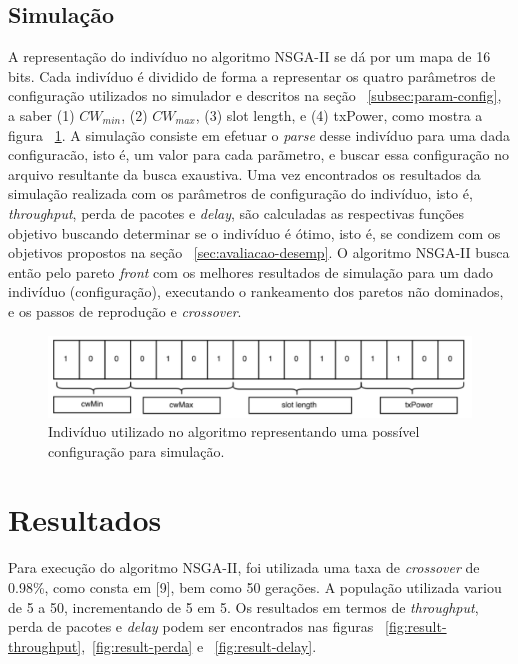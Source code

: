 \documentclass[conference]{IEEEtran}
\begin{document}
\subsection{Simulação}

A representação do indivíduo no algoritmo NSGA-II se dá por um mapa de 16 bits.  Cada indivíduo é dividido de forma a representar os quatro parâmetros de configuração utilizados no simulador e descritos na seção ~\ref{subsec:param-config}, a saber (1) $CW_{min}$, (2) $CW_{max}$, (3) slot length, e (4) txPower, como mostra a figura ~\ref{fig:bits-config}.  A simulação consiste em efetuar o \textit{parse} desse indivíduo para uma dada configuracão, isto é, um valor para cada parãmetro, e buscar essa configuração no arquivo resultante da busca exaustiva. Uma vez encontrados os resultados da simulação realizada com os parâmetros de configuração do indivíduo,
isto é, \textit{throughput}, perda de pacotes e \textit{delay}, são calculadas as respectivas funções objetivo buscando determinar se o indivíduo é ótimo, isto é, se condizem com os objetivos propostos na seção ~\ref{sec:avaliacao-desemp}. O algoritmo NSGA-II busca então pelo pareto \textit{front} com os melhores resultados de simulação para um dado indivíduo (configuração), executando o rankeamento dos paretos não dominados, e os passos de reprodução e \textit{crossover}.

\begin{figure}[t]
  \centering
  \includegraphics[scale=0.26]{figures/bits-config.png}
  \caption{Indivíduo utilizado no algoritmo representando uma possível configuração para simulação.}
  \label{fig:bits-config}
\end{figure}


\section{Resultados}

Para execução do algoritmo NSGA-II, foi utilizada uma taxa de \textit{crossover} de 0.98\%, como consta em [9], bem como 50 gerações.
A população utilizada variou de 5 a 50, incrementando de 5 em 5. Os resultados em termos de \textit{throughput}, perda de pacotes e \textit{delay}
podem ser encontrados nas figuras ~\ref{fig:result-throughput},~\ref{fig:result-perda} e ~\ref{fig:result-delay}.
\end{document}
